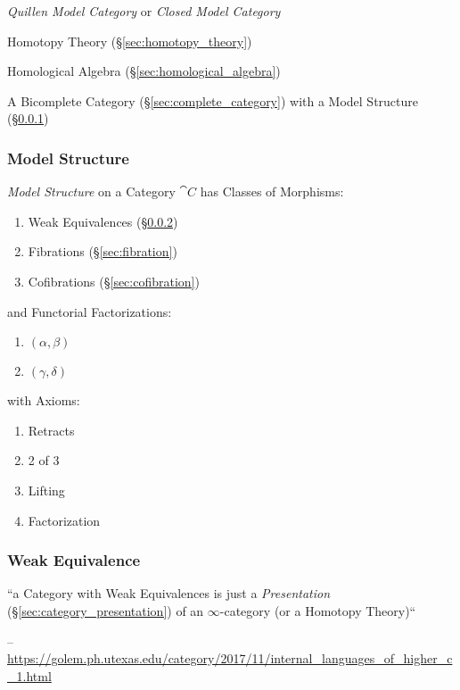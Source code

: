 \emph{Quillen Model Category} or \emph{Closed Model Category}

Homotopy Theory (\S\ref{sec:homotopy_theory})

Homological Algebra (\S\ref{sec:homological_algebra})

A Bicomplete Category (\S\ref{sec:complete_category}) with a Model
Structure (\S\ref{sec:model_structure})



\subsubsection{Model Structure}\label{sec:model_structure}

\emph{Model Structure} on a Category $\cat{C}$ has Classes of
Morphisms:
\begin{enumerate}
  \item Weak Equivalences (\S\ref{sec:weak_equivalence})
  \item Fibrations (\S\ref{sec:fibration})
  \item Cofibrations (\S\ref{sec:cofibration})
\end{enumerate}
and Functorial Factorizations:
\begin{enumerate}
  \item $(\alpha,\beta)$
  \item $(\gamma,\delta)$
\end{enumerate}
with Axioms:
\begin{enumerate}
  \item Retracts
  \item 2 of 3
  \item Lifting
  \item Factorization
\end{enumerate} %




\subsubsection{Weak Equivalence}\label{sec:weak_equivalence}

``a Category with Weak Equivalences is just a \emph{Presentation}
(\S\ref{sec:category_presentation}) of an $\infty$-category (or a Homotopy
Theory)``

--\url{https://golem.ph.utexas.edu/category/2017/11/internal_languages_of_higher_c_1.html}



